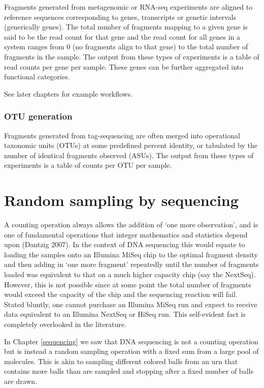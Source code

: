 \documentclass[onecolumn]{article}
\begin{document}
Fragments generated from metagenomic or RNA-seq experiments are aligned to reference sequences corresponding to genes, transcripts or genetic intervals (generically genes). The total number of fragments mapping to a given gene is said to be the read count for that gene and the read count for all genes in a system ranges from 0 (no fragments align to that gene) to the total number of fragments in the sample. The output from these types of experiments is a table of read counts per gene per sample. These genes can be further aggregated into functional categories.

See later chapters for example workflows.

\hypertarget{otu-generation}{%
\subsubsection{OTU generation}\label{otu-generation}}

Fragments generated from tag-sequencing are often merged into operational taxonomic units (OTUs) at some predefined percent identity, or tabulated by the number of identical fragments observed (ASUs). The output from these types of experiments is a table of counts per OTU per sample.

\hypertarget{random}{%
\section{Random sampling by sequencing}\label{random}}

A counting operation always allows the addition of `one more observation', and is one of fundamental operations that integer mathematics and statistics depend upon (Dantzig 2007). In the context of DNA sequencing this would equate to loading the samples onto an Illumina MiSeq chip to the optimal fragment density and then adding in `one more fragment' repeatedly until the number of fragments loaded was equivalent to that on a much higher capacity chip (say the NextSeq). However, this is not possible since at some point the total number of fragments would exceed the capacity of the chip and the sequencing reaction will fail. Stated bluntly, one cannot purchase an Illumina MiSeq run and expect to receive data equivalent to an Illumina NextSeq or HiSeq run. This self-evident fact is completely overlooked in the literature.

In Chapter \ref{sequencing} we saw that DNA sequencing is not a counting operation but is instead a random sampling operation with a fixed sum from a large pool of molecules. This is akin to sampling different colored balls from an urn that contains more balls than are sampled and stopping after a fixed number of balls are drawn.
\end{document}
